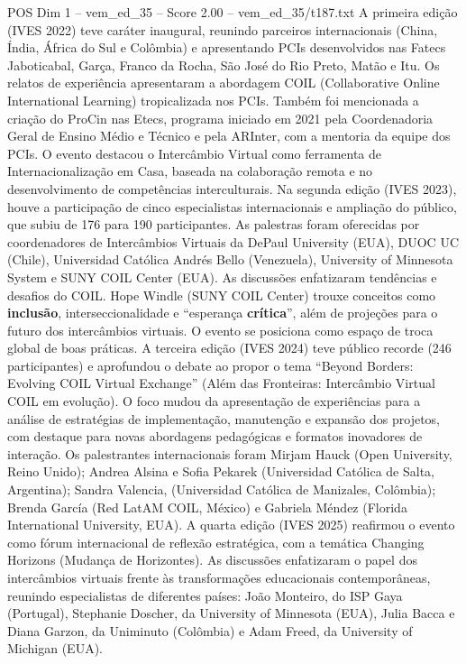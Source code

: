 \begin{textsample}{POS Dim 1 – vem\_ed\_35 – Score 2.00 – vem\_ed\_35/t187.txt}
A primeira edição (IVES 2022) teve caráter inaugural, reunindo parceiros internacionais (China, Índia, África do Sul e Colômbia) e apresentando PCIs desenvolvidos nas Fatecs Jaboticabal, Garça, Franco da Rocha, São José do Rio Preto, Matão e Itu.
Os relatos de experiência apresentaram a abordagem COIL (Collaborative Online International Learning) tropicalizada nos PCIs.
Também foi mencionada a criação do ProCin nas Etecs, programa iniciado em 2021 pela Coordenadoria Geral de Ensino Médio e Técnico e pela ARInter, com a mentoria da equipe dos PCIs.
O evento destacou o Intercâmbio Virtual como ferramenta de Internacionalização em Casa, baseada na colaboração remota e no desenvolvimento de competências interculturais.
Na segunda edição (IVES 2023), houve a participação de cinco especialistas internacionais e ampliação do público, que subiu de 176 para 190 participantes.
As palestras foram oferecidas por coordenadores de Intercâmbios Virtuais da DePaul University (EUA), DUOC UC (Chile), Universidad Católica Andrés Bello (Venezuela), University of Minnesota System e SUNY COIL Center (EUA).
As discussões enfatizaram tendências e desafios do COIL.
Hope Windle (SUNY COIL Center) trouxe conceitos como \textbf{inclusão}, interseccionalidade e “esperança \textbf{crítica}”, além de projeções para o futuro dos intercâmbios virtuais.
O evento se posiciona como espaço de troca global de boas práticas.
A terceira edição (IVES 2024) teve público recorde (246 participantes) e aprofundou o debate ao propor o tema “Beyond Borders: Evolving COIL Virtual Exchange” (Além das Fronteiras: Intercâmbio Virtual COIL em evolução).
O foco mudou da apresentação de experiências para a análise de estratégias de implementação, manutenção e expansão dos projetos, com destaque para novas abordagens pedagógicas e formatos inovadores de interação.
Os palestrantes internacionais foram Mirjam Hauck (Open University, Reino Unido); Andrea Alsina e Sofia Pekarek (Universidad Católica de Salta, Argentina); Sandra Valencia, (Universidad Católica de Manizales, Colômbia); Brenda García (Red LatAM COIL, México) e Gabriela Méndez (Florida International University, EUA).
A quarta edição (IVES 2025) reafirmou o evento como fórum internacional de reflexão estratégica, com a temática Changing Horizons (Mudança de Horizontes).
As discussões enfatizaram o papel dos intercâmbios virtuais frente às transformações educacionais contemporâneas, reunindo especialistas de diferentes países: João Monteiro, do ISP Gaya (Portugal), Stephanie Doscher, da University of Minnesota (EUA), Julia Bacca e Diana Garzon, da Uniminuto (Colômbia) e Adam Freed, da University of Michigan (EUA).

\end{textsample}

